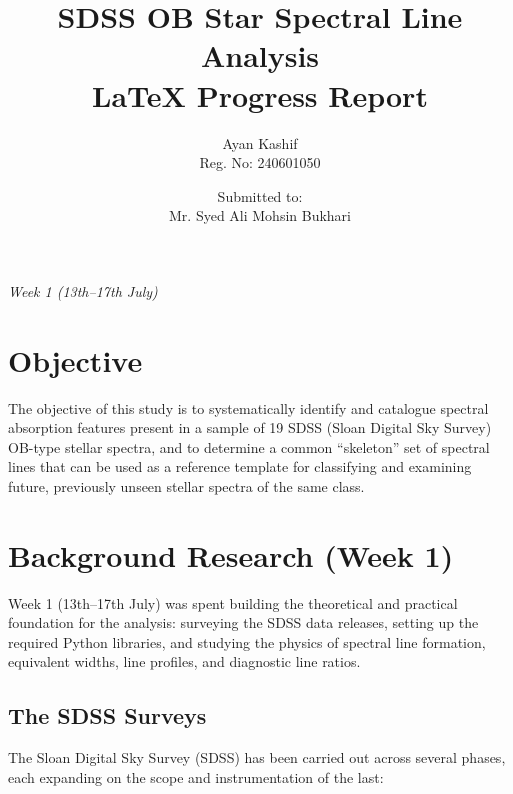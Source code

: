 \documentclass[12pt]{article}
\title{\textbf{SDSS OB Star Spectral Line Analysis}\\
\large LaTeX Progress Report}
\author{Ayan Kashif \\ \small Reg. No: 240601050}
\date{Submitted to:\\Mr. Syed Ali Mohsin Bukhari}
\begin{document}
\maketitle
\thispagestyle{empty}

\begin{center}
\textit{ Week 1 (13th--17th July)}
\end{center}

\clearpage
\tableofcontents
\clearpage
\listoftables
\clearpage


\section{Objective}
\label{sec:objective}

The objective of this study is to systematically identify and catalogue spectral absorption features present in a sample of 19 SDSS (Sloan Digital Sky Survey) OB-type stellar spectra, and to determine a common ``skeleton'' set of spectral lines that can be used as a reference template for classifying and examining future, previously unseen stellar spectra of the same class.


\section{Background Research (Week 1)}
\label{sec:background}

Week 1 (13th--17th July) was spent building the theoretical and practical foundation for the analysis: surveying the SDSS data releases, setting up the required Python libraries, and studying the physics of spectral line formation, equivalent widths, line profiles, and diagnostic line ratios.

\subsection{The SDSS Surveys}

The Sloan Digital Sky Survey (SDSS) has been carried out across several phases, each expanding on the scope and instrumentation of the last:
\end{document}
